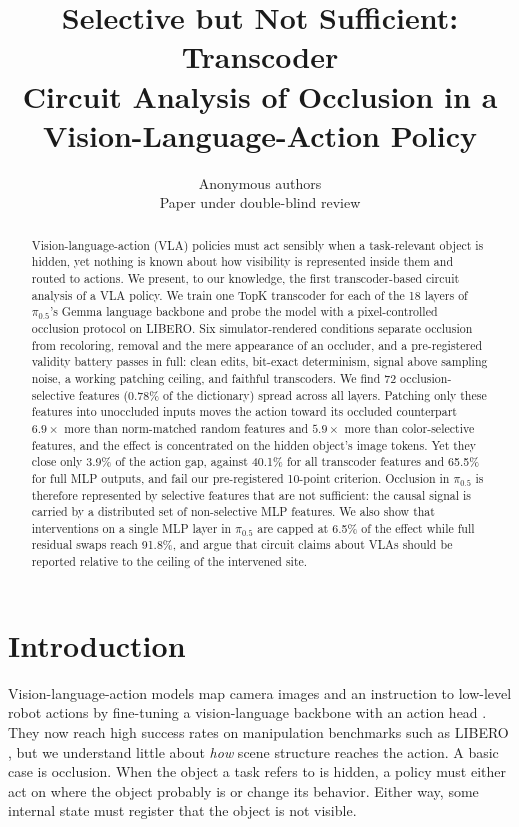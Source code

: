 \documentclass{article} %
\title{Selective but Not Sufficient: Transcoder\\Circuit Analysis of Occlusion in a\\Vision-Language-Action Policy}
\author{Anonymous authors\\
Paper under double-blind review}
\newcommand{\pifive}{$\pi_{0.5}$}
\begin{document}
\maketitle

\begin{abstract}
Vision-language-action (VLA) policies must act sensibly when a task-relevant object is hidden, yet nothing is known about how visibility is represented inside them and routed to actions. We present, to our knowledge, the first transcoder-based circuit analysis of a VLA policy. We train one TopK transcoder for each of the 18 layers of \pifive's Gemma language backbone and probe the model with a pixel-controlled occlusion protocol on LIBERO. Six simulator-rendered conditions separate occlusion from recoloring, removal and the mere appearance of an occluder, and a pre-registered validity battery passes in full: clean edits, bit-exact determinism, signal above sampling noise, a working patching ceiling, and faithful transcoders. We find 72 occlusion-selective features (0.78\% of the dictionary) spread across all layers. Patching only these features into unoccluded inputs moves the action toward its occluded counterpart $6.9\times$ more than norm-matched random features and $5.9\times$ more than color-selective features, and the effect is concentrated on the hidden object's image tokens. Yet they close only 3.9\% of the action gap, against 40.1\% for all transcoder features and 65.5\% for full MLP outputs, and fail our pre-registered 10-point criterion. Occlusion in \pifive{} is therefore represented by selective features that are not sufficient: the causal signal is carried by a distributed set of non-selective MLP features. We also show that interventions on a single MLP layer in \pifive{} are capped at 6.5\% of the effect while full residual swaps reach 91.8\%, and argue that circuit claims about VLAs should be reported relative to the ceiling of the intervened site.
\end{abstract}

\section{Introduction}
\label{sec:intro}

Vision-language-action models map camera images and an instruction to low-level robot actions by fine-tuning a vision-language backbone with an action head \citep{brohan2023rt2,kim2024openvla,black2024pi0,pi2025pi05}. They now reach high success rates on manipulation benchmarks such as LIBERO \citep{liu2023libero}, but we understand little about \emph{how} scene structure reaches the action. A basic case is occlusion. When the object a task refers to is hidden, a policy must either act on where the object probably is or change its behavior. Either way, some internal state must register that the object is not visible.
\end{document}
